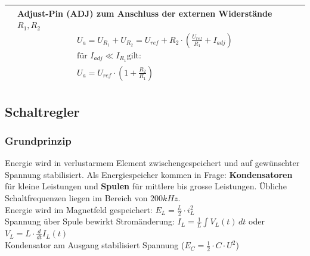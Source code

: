 \begin{longtable}{|l|l|l|}
\begin{minipage}{6cm}
		\end{minipage}
	&
		\begin{minipage}{8cm}
			Adjust-Pin (ADJ) zum Anschluss der externen Widerstände $R_1,R_2$
			\begin{gather*}
				U_a = U_{R_1} + U_{R_2} = U_{ref} + R_2 \cdot 
				\left(\frac{U_{ref}}{R_1} + I_{adj}\right) \\
				\text{für }I_{adj} \ll I_{R_1} \text{gilt:} \\
				U_a = U_{ref} \cdot \left(1+\frac{R_2}{R_1}\right)
			\end{gather*}
		\end{minipage}
	\\ \hline
\end{longtable}

\subsection{Schaltregler}
	\subsubsection{Grundprinzip}
		Energie wird in verlustarmem Element zwischengespeichert und auf gewünschter
		Spannung stabilisiert. Als Energiespeicher kommen in Frage: \textbf{Kondensatoren}
		für kleine Leistungen und \textbf{Spulen} für mittlere bis grosse Leistungen.
		Übliche Schaltfrequenzen liegen im Bereich von $200kHz$. \\
		
		Energie wird im Magnetfeld gespeichert: $E_L = \frac{L}{2} \cdot i_L^2$ \\
		Spannung über Spule bewirkt Stromänderung: $I_L = \frac{1}{L} \int V_L(t) \, dt$ 
		oder $V_L = L \cdot \frac{d}{dt} I_L(t)$\\
		Kondensator am Ausgang stabilisiert Spannung ($E_C = \frac{1}{2} \cdot C \cdot U^2$)\\
		
